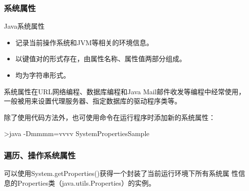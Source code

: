 \begin{frame}[fragile] %
  \frametitle{系统属性}

  \begin{block}{Java系统属性}
    \begin{itemize}
    \item 记录当前操作系统和JVM等相关的环境信息。
    \item 以{\hei\Red 键值对}的形式存在，由{\hei\Red 属性名称、属性值}两部分组成。
    \item 均为字符串形式。
    \end{itemize}
  \end{block}

  \pause
  

  系统属性在URL网络编程、数据库编程和Java Mail邮件收发等编程中经常使用，
  一般被用来设置代理服务器、指定数据库的驱动程序类等。

  除了使用代码方法外，也可使用命令在运行程序时添加新的系统属性：
  
  \begin{shCode}
    >java -Dmmmm=vvvv SystemPropertiesSample
  \end{shCode}
  
\end{frame}


\begin{frame}[fragile] %
  \frametitle{遍历、操作系统属性}

  \begin{block}{}
    可以使用System.getProperties()获得一个封装了当前运行环境下所有系统属
    性信息的Properties类（java.utils.Properties）的实例。
  \end{block}



  \begin{description}
  \item [] %
  \item [] %
  \item [] %
  \item [] 
  \item [] %
  \end{description}


\end{frame}

